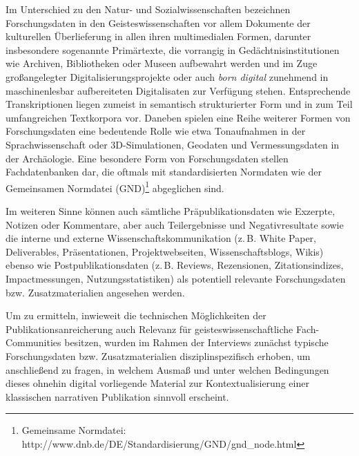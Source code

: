 \documentclass[a4paper,
fontsize=11pt,
oneside,
numbers=noperiodatend,
parskip=half-,
bibliography=totoc,
final
]{scrartcl}
\begin{document}
Im Unterschied zu den Natur- und Sozialwissenschaften bezeichnen
Forschungsdaten in den Geisteswissenschaften vor allem Dokumente der
kulturellen Überlieferung in allen ihren multimedialen Formen, darunter
insbesondere sogenannte Primärtexte, die vorrangig in
Gedächtnisinstitutionen wie Archiven, Bibliotheken oder Museen
aufbewahrt werden und im Zuge großangelegter Digitalisierungsprojekte
oder auch \emph{born digital} zunehmend in maschinenlesbar aufbereiteten
Digitalisaten zur Verfügung stehen. Entsprechende Transkriptionen liegen
zumeist in semantisch strukturierter Form und in zum Teil umfangreichen
Textkorpora vor. Daneben spielen eine Reihe weiterer Formen von
Forschungsdaten eine bedeutende Rolle wie etwa Tonaufnahmen in der
Sprachwissenschaft oder 3D-Simulationen, Geodaten und Vermessungsdaten
in der Archäologie. Eine besondere Form von Forschungsdaten stellen
Fachdatenbanken dar, die oftmals mit standardisierten Normdaten wie der
Gemeinsamen Normdatei (GND)\footnote{Gemeinsame Normdatei:
  http://www.dnb.de/DE/Standardisierung/GND/gnd\_node.html} abgeglichen
sind.

Im weiteren Sinne können auch sämtliche Präpublikationsdaten wie
Exzerpte, Notizen oder Kommentare, aber auch Teilergebnisse und
Negativresultate sowie die interne und externe
Wissenschaftskommunikation (z.\,B. White Paper, Deliverables,
Präsentationen, Projektwebseiten, Wissenschaftsblogs, Wikis) ebenso wie
Postpublikationsdaten (z.\,B. Reviews, Rezensionen, Zitationsindizes,
Impactmessungen, Nutzungsstatistiken) als potentiell relevante
Forschungsdaten bzw. Zusatzmaterialien angesehen werden.

Um zu ermitteln, inwieweit die technischen Möglichkeiten der
Publikationsanreicherung auch Relevanz für geisteswissenschaftliche
Fach-Communities besitzen, wurden im Rahmen der Interviews zunächst
typische Forschungsdaten bzw. Zusatzmaterialien disziplinspezifisch
erhoben, um anschließend zu fragen, in welchem Ausmaß und unter welchen
Bedingungen dieses ohnehin digital vorliegende Material zur
Kontextualisierung einer klassischen narrativen Publikation sinnvoll
erscheint.
\end{document}
